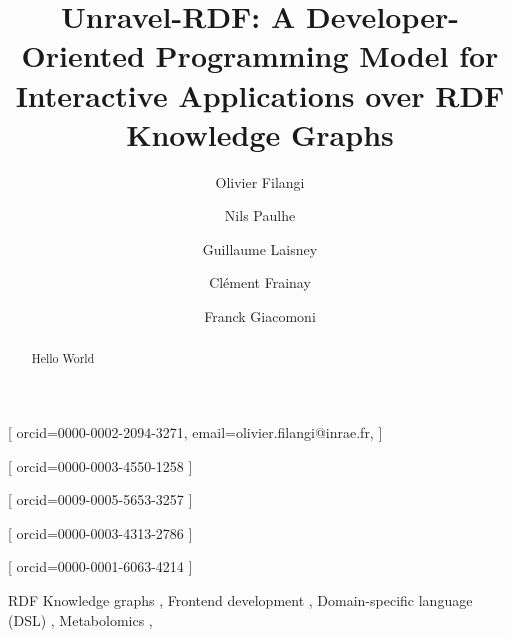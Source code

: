 \documentclass[
]{ceurart}
\begin{document}



\title{Unravel-RDF: A Developer-Oriented Programming Model for Interactive
Applications over RDF Knowledge Graphs}

\tnotemark[1]

\author[1,4]{Olivier Filangi}[%
  orcid=0000-0002-2094-3271,
  email=olivier.filangi@inrae.fr,
]

\cormark[1]

\author[2,4]{Nils Paulhe}[%
  orcid=0000-0003-4550-1258
]

\author[3,4]{Guillaume Laisney}[%
  orcid=0009-0005-5653-3257
]

\author[3,4]{Clément Frainay}[%
  orcid=0000-0003-4313-2786
]

\author[2,4]{Franck Giacomoni}[%
  orcid=0000-0001-6063-4214
]

\address[1]{Institute for Genetics, Environment and Plant Protection (IGEPP),
INRAE, Université de Rennes, Institut Agro Rennes-Angers, Le Rheu, France}

\address[2]{Human Nutrition Unit (UNH), UMR 1019 INRAE–Université d’Auvergne,
Clermont-Ferrand, France}

\address[3]{Toxalim, Research Centre in Food Toxicology, INRAE,
Université de Toulouse, ENVT, INP-Purpan, Toulouse, France}

\address[4]{MetaboHUB National Infrastructure for Metabolomics and Fluxomics,
France}



\begin{abstract}
  Hello World
\end{abstract}


\begin{keywords}
  RDF Knowledge graphs \sep
  Frontend development \sep
  Domain-specific language (DSL) \sep
  Metabolomics \sep
\end{keywords}
\end{document}
